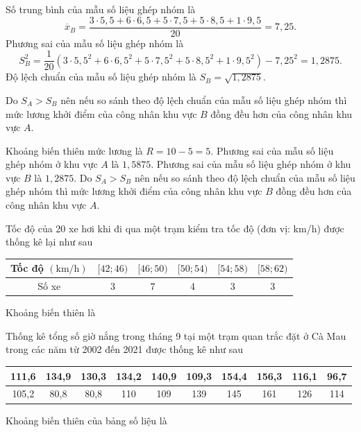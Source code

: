 \begin{ex}[Mức độ 2]
{\begin{itemize}
\begin{itemize}
			Số trung bình của mẫu số liệu ghép nhóm là
			$$ \overline{x}_B=\dfrac{3\cdot 5{,}5+6\cdot 6{,}5+5\cdot 7{,}5+5\cdot 8{,}5+1\cdot 9{,}5}{20}=7{,}25. $$
			Phương sai của mẫu số liệu ghép nhóm là
			$$ S_B^2=\dfrac{1}{20}\left( 3\cdot 5{,}5^2+6\cdot 6{,}5^2+5\cdot 7{,}5^2+5\cdot 8{,}5^2+1\cdot 9{,}5^2\right)-7{,}25^2=1{,}2875.  $$
			Độ lệch chuẩn của mẫu số liệu ghép nhóm là $ S_B=\sqrt{1{,}2875} $.
		\end{itemize}
		Do $S_A > S_B$ nên nếu so sánh theo độ lệch chuẩn của mẫu số liệu ghép nhóm thì mức lương khởi điểm của công nhân khu vực $B$ đồng đều hơn của công nhân khu vực $A$.
	\end{itemize}
	\begin{itemchoice}
		\itemch Khoảng biến thiên mức lương là $ R=10-5=5 $.
		\itemch Phương sai của mẫu số liệu ghép nhóm ở khu vực $ A $ là $ 1{,}5875 $.
		\itemch Phương sai của mẫu số liệu ghép nhóm ở khu vực $ B $ là $ 1{,}2875 $.
		\itemch Do $S_A > S_B$ nên nếu so sánh theo độ lệch chuẩn của mẫu số liệu ghép nhóm thì mức lương khởi điểm của công nhân khu vực $B$ đồng đều hơn của công nhân khu vực $A$.
	\end{itemchoice}	
}
\end{ex}

\begin{ex}[Mức độ 1]%
	Tốc độ của 20 xe hơi khi đi qua một trạm kiểm tra tốc độ (đơn vị: km/h) được thống kê lại như sau
	\begin{center}
		\begin{tabular}{|c|c|c|c|c|c|}
			\hline Tốc độ $(\mathrm{km} / \mathrm{h})$ & {$[42 ; 46)$} & {$[46 ; 50)$} & {$[50 ; 54)$} & {$[54 ; 58)$} & {$[58 ; 62)$} \\
			\hline Số xe & 3 & 7 & 4 & 3 & 3 \\
			\hline
		\end{tabular}
	\end{center}
	Khoảng biến thiên là
\end{ex}

\begin{ex}[Mức độ 1]%
	Thống kê tổng số giờ nắng trong tháng 9 tại một trạm quan trắc đặt ở Cà Mau trong các năm từ 2002 đến 2021 được thống kê như sau
	\begin{center}
		\begin{tabular}{|c|c|c|c|c|c|c|c|c|c|}
			\hline 111,6 & 134,9 & 130,3 & 134,2 & 140,9 & 109,3 & 154,4 & 156,3 & 116,1 & 96,7 \\
			\hline 105,2 & 80,8 & 80,8 & 110 & 109 & 139 & 145 & 161 & 126 & 114 \\
			\hline
		\end{tabular}
	\end{center}
	Khoảng biến thiên của bảng số liệu là
\end{ex}

